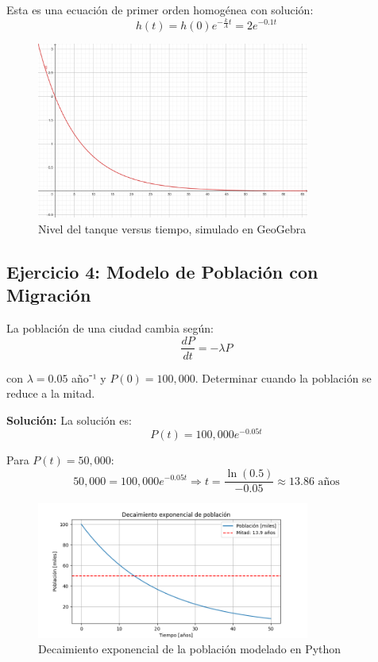 \documentclass[12pt]{article}
\begin{document}
Esta es una ecuación de primer orden homogénea con solución:
\begin{equation}
    h(t) = h(0) e^{-\frac{k}{A}t} = 2 e^{-0.1t}
\end{equation}

\begin{figure}[H]
    \centering
    \includegraphics[width=0.8\textwidth]{imagen-ejercicio3.png}
    \caption{Nivel del tanque versus tiempo, simulado en GeoGebra}
\end{figure}

\subsection{Ejercicio 4: Modelo de Población con Migración}

La población de una ciudad cambia según:
\begin{equation}
    \frac{dP}{dt} = -\lambda P
\end{equation}

con $\lambda = 0.05$ año⁻¹ y $P(0) = 100,000$. Determinar cuando la población se reduce a la mitad.

\textbf{Solución:}
La solución es:
\begin{equation}
    P(t) = 100,000 e^{-0.05t}
\end{equation}

Para $P(t) = 50,000$:
\begin{equation}
    50,000 = 100,000 e^{-0.05t} \Rightarrow t = \frac{\ln(0.5)}{-0.05} \approx 13.86 \text{ años}
\end{equation}

\begin{figure}[H]
    \centering
    \includegraphics[width=0.8\textwidth]{imagen-ejercicio4.png}
    \caption{Decaimiento exponencial de la población modelado en Python}
\end{figure}
\end{document}
